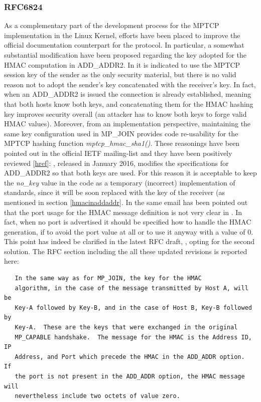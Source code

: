 \subsubsection{RFC6824}
As a complementary part of the development process for the MPTCP implementation in the Linux Kernel, efforts have been placed to improve the official documentation counterpart for the protocol. In particular, a somewhat substantial modification have been proposed regarding the key adopted for the HMAC computation in ADD\_ADDR2. In  it is indicated to use the MPTCP session key of the sender as the only security material, but there is no valid reason not to adopt the sender's key concatenated with the receiver's key. In fact, when an ADD\_ADDR2 is issued the connection is already established, meaning that both hosts know both keys, and concatenating them for the HMAC hashing key improves security overall (an attacker has to know both keys to forge valid HMAC values). Moreover, from an implementation perspective, maintaining the same key configuration used in MP\_JOIN provides code re-usability for the MPTCP hashing function \textit{mptcp\_hmac\_sha1()}.
These reasonings have been pointed out in the official IETF mailing-list and they have been positively reviewed [\href{https://mailarchive.ietf.org/arch/search/?email_list=multipathtcp&q=RFC6824bis-04+ADD_ADDR2+comments}{href}]: , released in January 2016, modifies the specifications for ADD\_ADDR2 so that both keys are used. For this reason it is acceptable to keep the \textit{no\_key} value in the code as a temporary (incorrect) implementation of  standards, since it will be soon replaced with the key of the receiver (as mentioned in section \ref{hmacinaddaddr}. 
In the same email has been pointed out that the port usage for the HMAC message definition is not very clear in . In fact, when no port is advertised it should be specified how to handle the HMAC generation, if to avoid the port value at all or to use it anyway with a value of 0. This point has indeed be clarified in the latest RFC draft, , opting for the second solution. The RFC section including the all these updated revisions is reported here:

\begin{verbatim}
   In the same way as for MP_JOIN, the key for the HMAC
   algorithm, in the case of the message transmitted by Host A, will be
   Key-A followed by Key-B, and in the case of Host B, Key-B followed by
   Key-A.  These are the keys that were exchanged in the original
   MP_CAPABLE handshake.  The message for the HMAC is the Address ID, IP
   Address, and Port which precede the HMAC in the ADD_ADDR option.  If
   the port is not present in the ADD_ADDR option, the HMAC message will
   nevertheless include two octets of value zero.
\end{verbatim}

